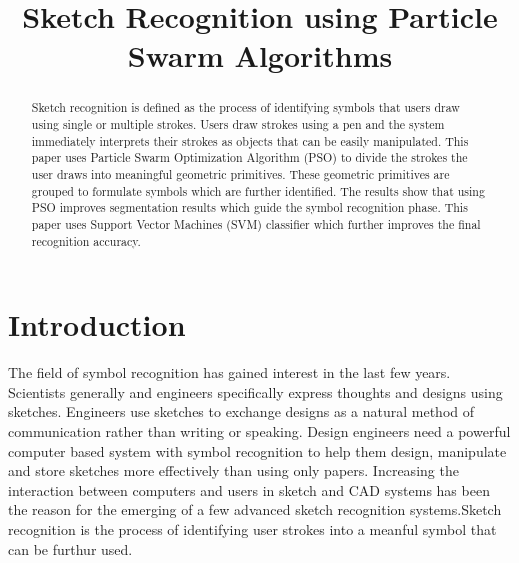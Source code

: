 \documentclass{article}
\title{Sketch Recognition using Particle Swarm Algorithms}
\begin{document}
\maketitle
\begin{abstract}
Sketch recognition is defined as the process of identifying symbols that users draw using single or multiple strokes. Users draw strokes using a pen and the system immediately interprets their strokes as objects that can be easily manipulated. This paper uses Particle Swarm Optimization Algorithm (PSO) to divide the strokes the user draws into meaningful geometric primitives. These geometric primitives are grouped to formulate symbols which are further identified. The results show that using PSO improves segmentation results which guide the symbol recognition phase. This paper uses Support Vector Machines (SVM) classifier which further improves the final recognition accuracy.  
\end{abstract}
\section{Introduction}
The field of symbol recognition has gained interest in the last few years. Scientists generally and engineers specifically express thoughts and designs using sketches. Engineers use sketches to exchange designs as a natural method of communication rather than writing or speaking. Design engineers need a powerful computer based system with symbol recognition to help them design, manipulate and store sketches more effectively than using only papers. Increasing the interaction between computers and users in sketch and CAD systems has been the reason for the emerging of a few advanced sketch recognition systems.Sketch recognition is the process of identifying user strokes into a meanful symbol that can be furthur used.  
\end{document}
